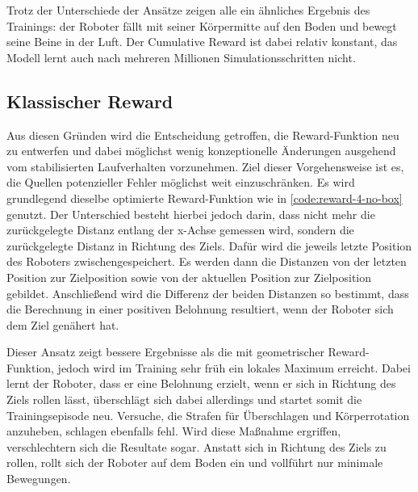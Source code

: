 Trotz der Unterschiede der Ansätze zeigen alle ein ähnliches Ergebnis des Trainings: der Roboter fällt mit seiner Körpermitte auf den Boden und bewegt seine Beine in der Luft.
Der Cumulative Reward ist dabei relativ konstant, das Modell lernt auch nach mehreren Millionen Simulationsschritten nicht.

\subsection{Klassischer Reward}
\label{sec:classic-reward}
Aus diesen Gründen wird die Entscheidung getroffen, die Reward-Funktion neu zu entwerfen und dabei möglichst wenig konzeptionelle Änderungen ausgehend vom stabilisierten Laufverhalten vorzunehmen.
Ziel dieser Vorgehensweise ist es, die Quellen potenzieller Fehler möglichst weit einzuschränken.
Es wird grundlegend dieselbe optimierte Reward-Funktion wie in \autoref{code:reward-4-no-box} genutzt.
Der Unterschied besteht hierbei jedoch darin, dass nicht mehr die zurückgelegte Distanz entlang der x-Achse gemessen wird, sondern die zurückgelegte Distanz in Richtung des Ziels.
Dafür wird die jeweils letzte Position des Roboters zwischengespeichert.
Es werden dann die Distanzen von der letzten Position zur Zielposition sowie von der aktuellen Position zur Zielposition gebildet.
Anschließend wird die Differenz der beiden Distanzen so bestimmt, dass die Berechnung in einer positiven Belohnung resultiert, wenn der Roboter sich dem Ziel genähert hat.

Dieser Ansatz zeigt bessere Ergebnisse als die mit geometrischer Reward-Funktion, jedoch wird im Training sehr früh ein lokales Maximum erreicht.
Dabei lernt der Roboter, dass er eine Belohnung erzielt, wenn er sich in Richtung des Ziels rollen lässt, überschlägt sich dabei allerdings und startet somit die Trainingsepisode neu.
Versuche, die Strafen für Überschlagen und Körperrotation anzuheben, schlagen ebenfalls fehl.
Wird diese Maßnahme ergriffen, verschlechtern sich die Resultate sogar.
Anstatt sich in Richtung des Ziels zu rollen, rollt sich der Roboter auf dem Boden ein und vollführt nur minimale Bewegungen.

